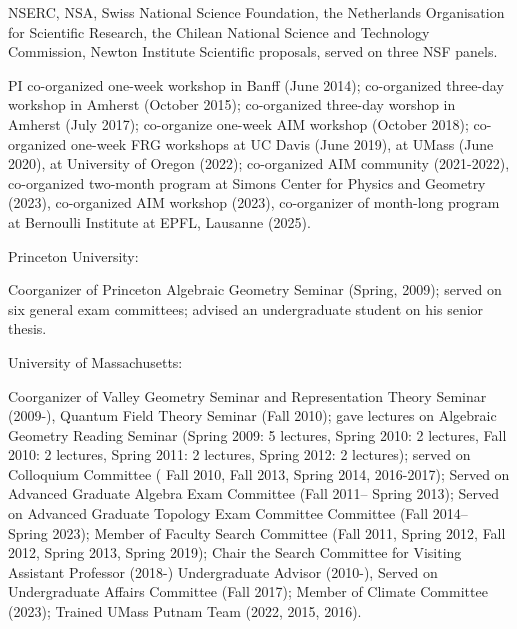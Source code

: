 \documentclass[11pt]{amsart}
\theoremstyle{plain}
\theoremstyle{definition}
\theoremstyle{remark}
\begin{document}
 NSERC, NSA, Swiss National Science Foundation,
 the Netherlands Organisation for Scientific Research, the Chilean National Science and Technology Commission,
Newton Institute Scientific proposals, served on three NSF panels.


\medskip

PI co-organized one-week workshop in Banff (June 2014); co-organized three-day workshop in Amherst (October 2015); co-organized
three-day worshop in Amherst (July 2017); co-organize one-week AIM workshop (October 2018); co-organized one-week FRG workshops
at UC Davis (June 2019), at UMass (June 2020), at University of Oregon (2022); co-organized AIM community (2021-2022),
co-organized two-month program at Simons Center for Physics and Geometry (2023), co-organized AIM workshop (2023), co-organizer of
month-long program at Bernoulli Institute at EPFL, Lausanne (2025).

\medskip

\medskip


\medskip

\noindent Princeton University:



\noindent Coorganizer of Princeton Algebraic Geometry Seminar (Spring, 2009); served on six general exam committees; advised an undergraduate student on his senior thesis.


\medskip

\noindent University of Massachusetts:

\noindent Coorganizer of Valley Geometry Seminar and Representation Theory Seminar (2009-), Quantum Field Theory Seminar (Fall 2010);
gave   lectures on Algebraic Geometry Reading Seminar (Spring 2009: 5 lectures, Spring 2010: 2 lectures, Fall 2010: 2 lectures, Spring 2011: 2 lectures, Spring 2012: 2 lectures); 
served on Colloquium Committee ( Fall 2010, Fall 2013, Spring 2014, 2016-2017); 
Served on Advanced Graduate Algebra Exam Committee (Fall 2011-- Spring 2013); Served on Advanced Graduate Topology Exam Committee Committee (Fall 2014-- Spring 2023);
Member of Faculty Search Committee 
(Fall 2011, Spring 2012, Fall 2012, Spring 2013, Spring 2019); Chair the Search Committee for Visiting Assistant Professor (2018-)
Undergraduate Advisor (2010-), Served on Undergraduate Affairs Committee (Fall 2017); Member of Climate Committee (2023);
Trained UMass Putnam Team (2022, 2015, 2016). 
\end{document}
